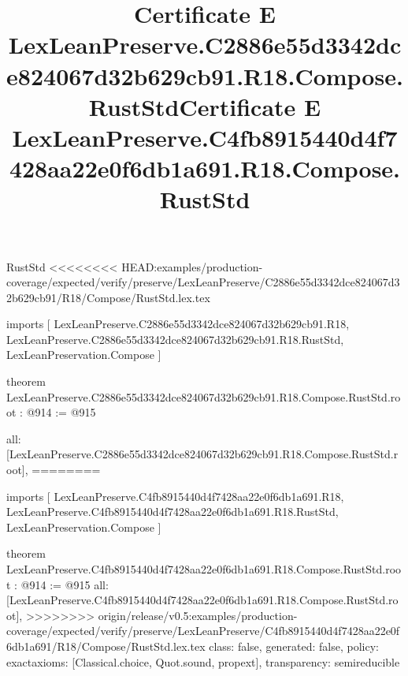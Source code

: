 \begin{lexlean}{RustStd}
<<<<<<<< HEAD:examples/production-coverage/expected/verify/preserve/LexLeanPreserve/C2886e55d3342dce824067d32b629cb91/R18/Compose/RustStd.lex.tex
\title{Certificate E LexLeanPreserve.C2886e55d3342dce824067d32b629cb91.R18.Compose.RustStd}
\begin{coremodule}
imports [
  LexLeanPreserve.C2886e55d3342dce824067d32b629cb91.R18,
  LexLeanPreserve.C2886e55d3342dce824067d32b629cb91.R18.RustStd,
  LexLeanPreservation.Compose
]

theorem LexLeanPreserve.C2886e55d3342dce824067d32b629cb91.R18.Compose.RustStd.root : @914 := @915 {
  all: [LexLeanPreserve.C2886e55d3342dce824067d32b629cb91.R18.Compose.RustStd.root],
========
\title{Certificate E LexLeanPreserve.C4fb8915440d4f7428aa22e0f6db1a691.R18.Compose.RustStd}
\begin{coremodule}
imports [
  LexLeanPreserve.C4fb8915440d4f7428aa22e0f6db1a691.R18,
  LexLeanPreserve.C4fb8915440d4f7428aa22e0f6db1a691.R18.RustStd,
  LexLeanPreservation.Compose
]

theorem LexLeanPreserve.C4fb8915440d4f7428aa22e0f6db1a691.R18.Compose.RustStd.root : @914 := @915 {
  all: [LexLeanPreserve.C4fb8915440d4f7428aa22e0f6db1a691.R18.Compose.RustStd.root],
>>>>>>>> origin/release/v0.5:examples/production-coverage/expected/verify/preserve/LexLeanPreserve/C4fb8915440d4f7428aa22e0f6db1a691/R18/Compose/RustStd.lex.tex
  class: false,
  generated: false,
  policy: exact{axioms: [Classical.choice, Quot.sound, propext]},
  transparency: semireducible
}


\end{coremodule}}
\end{coremodule}
\end{lexlean}
